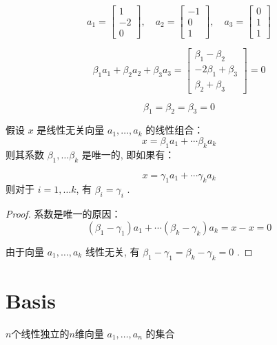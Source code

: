 \begin{example}
    $$ a_{1}=\left[\begin{array}{c}1 \\ -2 \\ 0\end{array}\right], \quad a_{2}=\left[\begin{array}{c}-1 \\ 0 \\ 1\end{array}\right], \quad a_{3}=\left[\begin{array}{l}0 \\ 1 \\ 1\end{array}\right] $$

    $$ \beta_{1} a_{1}+\beta_{2} a_{2}+\beta_{3} a_{3}=\left[\begin{array}{c}\beta_{1}-\beta_{2} \\ -2 \beta_{1}+\beta_{3} \\ \beta_{2}+\beta_{3}\end{array}\right]=0 $$

    $$ \beta_{1}=\beta_{2}=\beta_{3}=0 $$
\end{example}

\begin{theorem}
    假设 $ x $ 是线性无关向量 $ a_{1}, \ldots, a_{k} $ 的线性组合：
$$
x=\beta_{1} a_{1}+\cdots \beta_{k} a_{k}
$$
则其系数 $ \beta_{1}, \ldots \beta_{k} $ 是唯一的, 即如果有：

$$
x=\gamma_{1} a_{1}+\cdots \gamma_{k} a_{k}
$$
则对于 $ i=1, \ldots k $, 有 $ \beta_{i}=\gamma_{i} $ . 
\end{theorem}

\begin{proof}
    系数是唯一的原因：
$$
\left(\beta_{1}-\gamma_{1}\right) a_{1}+\cdots\left(\beta_{k}-\gamma_{k}\right) a_{k}=x-x=0
$$

由于向量 $ a_{1}, \ldots, a_{k} $ 线性无关, 有 $ \beta_{1}-\gamma_{1}=\beta_{k}-\gamma_{k}=0 $ . 
\end{proof}

\section{Basis}

\begin{definition}[基 (Basis)]
    $n$个线性独立的$n$维向量 $ a_{1}, \ldots, a_{n} $ 的集合
\end{definition}

